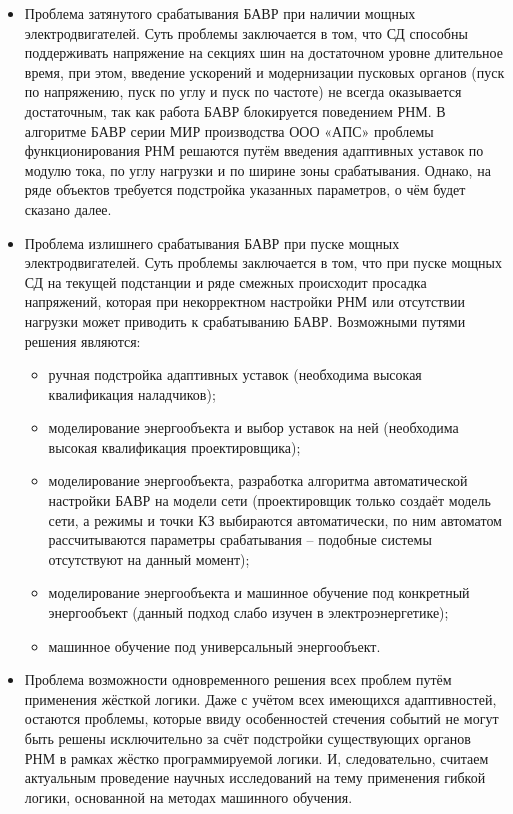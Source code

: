 \begin{itemize}[leftmargin=*,itemsep=0pt]
    \item Проблема затянутого срабатывания БАВР при наличии мощных электродвигателей. Суть проблемы заключается в том, что СД способны поддерживать напряжение на секциях шин на достаточном уровне длительное время, при этом, введение ускорений и модернизации пусковых органов (пуск по напряжению, пуск по углу и пуск по частоте) не всегда оказывается достаточным, так как работа БАВР блокируется поведением РНМ. В алгоритме БАВР серии МИР производства ООО «АПС» проблемы функционирования РНМ решаются путём введения адаптивных уставок по модулю тока, по углу нагрузки и по ширине зоны срабатывания. Однако, на ряде объектов требуется подстройка указанных параметров, о чём будет сказано далее.
    \item Проблема излишнего срабатывания БАВР при пуске мощных электродвигателей. Суть проблемы заключается в том, что при пуске мощных СД на текущей подстанции и ряде смежных происходит просадка напряжений, которая при некорректном настройки РНМ или отсутствии нагрузки может приводить к срабатыванию БАВР. Возможными путями решения являются:
    \begin{itemize}[leftmargin=*,itemsep=0pt]
        \item ручная подстройка адаптивных уставок (необходима высокая квалификация наладчиков);
        \item моделирование энергообъекта и выбор уставок на ней (необходима высокая квалификация проектировщика);
        \item моделирование энергообъекта, разработка алгоритма автоматической настройки БАВР на модели сети (проектировщик только создаёт модель сети, а режимы и точки КЗ выбираются автоматически, по ним автоматом рассчитываются параметры срабатывания -- подобные системы отсутствуют на данный момент);
        \item моделирование энергообъекта и машинное обучение под конкретный энергообъект (данный подход слабо изучен в электроэнергетике);
        \item машинное обучение под универсальный энергообъект.
    \end{itemize}
    \item Проблема возможности одновременного решения всех проблем путём применения жёсткой логики. Даже с учётом всех имеющихся адаптивностей, остаются проблемы, которые ввиду особенностей стечения событий не могут быть решены исключительно за счёт подстройки существующих органов РНМ в рамках жёстко программируемой логики. И, следовательно, считаем актуальным проведение научных исследований на тему применения гибкой логики, основанной на методах машинного обучения.

\end{itemize}
